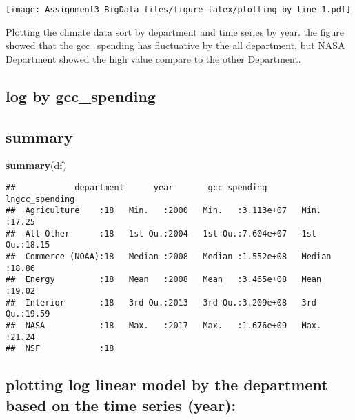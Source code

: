 \documentclass[]{article}
\newenvironment{Shaded}{\begin{snugshade}}{\end{snugshade}}
\newcommand{\KeywordTok}[1]{\textcolor[rgb]{0.13,0.29,0.53}{\textbf{#1}}}
\newcommand{\StringTok}[1]{\textcolor[rgb]{0.31,0.60,0.02}{#1}}
\newcommand{\OperatorTok}[1]{\textcolor[rgb]{0.81,0.36,0.00}{\textbf{#1}}}
\newcommand{\NormalTok}[1]{#1}
\begin{document}
\texttt{[image: Assignment3\_BigData\_files/figure-latex/plotting by line-1.pdf]}

Plotting the climate data sort by department and time series by year.
the figure showed that the gcc\_spending has fluctuative by the all
department, but NASA Department showed the high value compare to the
other Department.

\subsection{log by gcc\_spending}\label{log-by-gcc_spending}

\begin{Shaded}
\end{Shaded}

\subsection{summary}\label{summary}

\begin{Shaded}
\begin{Highlighting}[]
\KeywordTok{summary}\NormalTok{(df)}
\end{Highlighting}
\end{Shaded}

\begin{verbatim}
##            department      year       gcc_spending       lngcc_spending 
##  Agriculture    :18   Min.   :2000   Min.   :3.113e+07   Min.   :17.25  
##  All Other      :18   1st Qu.:2004   1st Qu.:7.604e+07   1st Qu.:18.15  
##  Commerce (NOAA):18   Median :2008   Median :1.552e+08   Median :18.86  
##  Energy         :18   Mean   :2008   Mean   :3.465e+08   Mean   :19.02  
##  Interior       :18   3rd Qu.:2013   3rd Qu.:3.209e+08   3rd Qu.:19.59  
##  NASA           :18   Max.   :2017   Max.   :1.676e+09   Max.   :21.24  
##  NSF            :18
\end{verbatim}

\subsection{plotting log linear model by the department based on the
time series
(year):}\label{plotting-log-linear-model-by-the-department-based-on-the-time-series-year}
\end{document}
